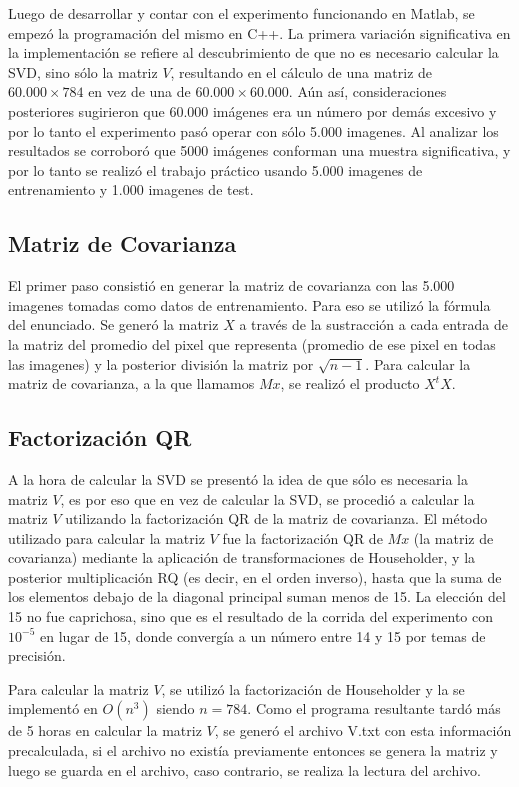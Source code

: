 Luego de desarrollar y contar con el experimento funcionando en Matlab, se empez\'o la programaci\'on
del mismo en C++. La primera variaci\'on significativa en la implementaci\'on se refiere al 
descubrimiento de que no es necesario calcular la SVD, sino s\'olo la matriz $V$, resultando 
en el c\'alculo de una matriz de $60.000 \times 784$ en vez de una de $60.000 \times 60.000$.
A\'un as\'i, consideraciones posteriores sugirieron que 60.000 im\'agenes era un n\'umero por 
dem\'as excesivo y por lo tanto el experimento pas\'o operar con s\'olo 5.000 imagenes. 
Al analizar los resultados se corrobor\'o que 5000 im\'agenes conforman una muestra significativa, 
y por lo tanto se realiz\'o el trabajo pr\'actico usando 5.000 imagenes de entrenamiento y 1.000 imagenes de test.

\subsection{Matriz de Covarianza}
El primer paso consisti\'o en generar la matriz de covarianza con las 5.000 imagenes tomadas como datos 
de entrenamiento. Para eso se utiliz\'o la f\'ormula del enunciado. Se gener\'o la matriz $X$ a trav\'es 
de la sustracci\'on a cada entrada de la matriz del promedio del pixel que representa (promedio de ese 
pixel en todas las imagenes) y la posterior divisi\'on la matriz por $\sqrt{n-1}$. Para calcular la
matriz de covarianza, a la que llamamos $Mx$, se realiz\'o el producto $X^tX$. 

\subsection{Factorizaci\'on QR}
A la hora de calcular la SVD se present\'o la idea de que s\'olo es necesaria la matriz $V$, es por 
eso que en vez de calcular la SVD, se procedi\'o a calcular la matriz $V$ utilizando la factorizaci\'on 
QR de la matriz de covarianza. El m\'etodo utilizado para calcular la matriz $V$ fue la factorizaci\'on
QR de $Mx$ (la matriz de covarianza) mediante la aplicaci\'on de transformaciones de Householder, y la
posterior multiplicaci\'on RQ (es decir, en el orden inverso), hasta que la suma de los elementos debajo 
de la diagonal principal suman menos de 15. La elecci\'on del 15 no fue caprichosa, sino que es el 
resultado de la corrida del experimento con $10^{-5}$ en lugar de 15, donde converg\'ia a un n\'umero 
entre 14 y 15 por temas de precisi\'on.

Para calcular la matriz $V$, se utiliz\'o la factorizaci\'on de Householder y la se implement\'o en $O(n^3)$ 
siendo $n = 784$. Como el programa resultante tard\'o m\'as de 5 horas en calcular la matriz $V$, se gener\'o 
el archivo V.txt con esta informaci\'on precalculada, si el archivo no exist\'ia previamente entonces se 
genera la matriz y luego se guarda en el archivo, caso contrario, se realiza la lectura del archivo.

